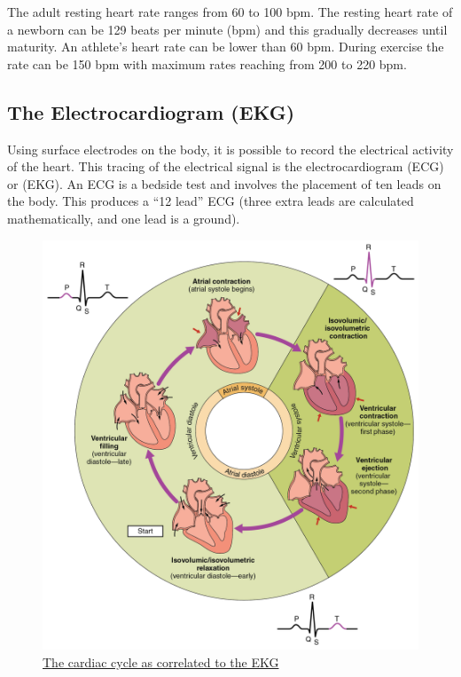 The adult resting heart rate ranges from 60 to 100 bpm. The resting heart rate of a newborn can be 129 beats per minute (bpm) and this gradually decreases until maturity. An athlete's heart rate can be lower than 60 bpm. During exercise the rate can be 150 bpm with maximum rates reaching from 200 to 220 bpm.

\hypertarget{the-electrocardiogram-ekg}{%
\subsection{The Electrocardiogram (EKG)}\label{the-electrocardiogram-ekg}}

Using surface electrodes on the body, it is possible to record the electrical activity of the heart. This tracing of the electrical signal is the electrocardiogram (ECG) or (EKG). An ECG is a bedside test and involves the placement of ten leads on the body. This produces a ``12 lead'' ECG (three extra leads are calculated mathematically, and one lead is a ground).



\begin{figure}

{\centering \includegraphics[width=0.7\linewidth]{./figures/circulation/2027_Phases_of_the_Cardiac_Cycle} 

}

\caption{\href{https://commons.wikimedia.org/wiki/File:2027_Phases_of_the_Cardiac_Cycle.jpg}{The cardiac cycle as correlated to the EKG}}\label{fig:cardiacekg}
\end{figure}

